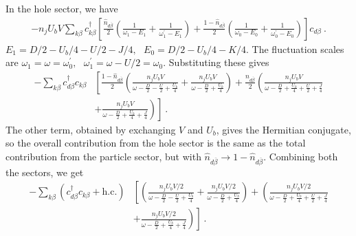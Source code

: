 \documentclass{iopart}
\begin{document}
In the hole sector, we have
\begin{eqnarray}
	-n_jU_b V\sum_{k\beta} c^\dagger_{k\beta} \left[\frac{\hat n_{d\overline\beta}}{2}\left(\frac{1}{\omega_1 - E_1} + \frac{1}{\omega^\prime_1 - E_1}\right) + \frac{1-\hat n_{d\overline\beta}}{2}\left(\frac{1}{\omega_0 - E_0} + \frac{1}{\omega_0^\prime - E_0}\right)\right] c_{d\beta}~.
\end{eqnarray}
\(E_1 = D/2 - U_b/4 - U/2 - J/4,~ ~ ~ E_0 = D/2 - U_b/4 - K/4\). The fluctuation scales are \(\omega_1 = \omega = \omega_0^\prime,~ ~ ~ \omega_1^\prime = \omega - U/2 = \omega_0\). Substituting these gives
\begin{eqnarray}
	-\sum_{k\beta} c^\dagger_{d\beta} c_{k\beta} &\left[\frac{1 - \hat n_{d\overline\beta}}{2}\left(\frac{n_jU_b V}{\omega - \frac{D}{2} - \frac{U}{2} + \frac{U_b}{4}} + \frac{n_jU_b V}{\omega - \frac{D}{2} + \frac{U_b}{4}}\right) + \frac{\hat n_{d\overline\beta}}{2}\left(\frac{n_jU_b V}{\omega - \frac{D}{2} + \frac{U_b}{4} + \frac{U}{2} + \frac{J}{4}} \right. \right. \nonumber\\
						     &\left.\left.+ \frac{n_jU_b V}{\omega - \frac{D}{2} + \frac{U_b}{4} + \frac{J}{4}}\right)\right]~.
\end{eqnarray}
The other term, obtained by exchanging \(V\) and \(U_b\), gives the Hermitian conjugate, so the overall contribution from the hole sector is the same as the total contribution from the particle sector, but with \(\hat n_{d\overline\beta} \to 1 - \hat n_{d\overline\beta}\). Combining both the sectors, we get
\begin{eqnarray}
	-\sum_{k\beta} \left(c^\dagger_{d\beta} c_{k\beta} + \text{h.c.}\right) &\left[\left(\frac{n_jU_b V/2}{\omega - \frac{D}{2} - \frac{U}{2} + \frac{U_b}{4}} + \frac{n_jU_b V/2}{\omega - \frac{D}{2} + \frac{U_b}{4}}\right) + \left(\frac{n_jU_b V/2}{\omega - \frac{D}{2} + \frac{U_b}{4} + \frac{U}{2} + \frac{J}{4}} \right.\right.\nonumber\\
										&\left.\left.+ \frac{n_jU_b V/2}{\omega - \frac{D}{2} + \frac{U_b}{4} + \frac{J}{4}}\right)\right]~.
\end{eqnarray}
\end{document}
